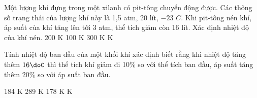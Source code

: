 
\begin{vidu} %
	Một lượng khí đựng trong một xilanh có pit-tông chuyển động được. Các thông số trạng thái của lượng khí này là 1,5 atm, 20 lít, $-23^\circ C$. Khi pit-tông nén khí, áp suất của khí tăng lên tới 3 atm, thể tích giảm còn 16 lít. Xác định nhiệt độ của khí nén.
	\choice
	{200 K}
	{100 K}
	{300 K}
	{ K}
\end{vidu}
\begin{vidu} %
	Tính nhiệt độ ban đầu của một khối khí xác định biết rằng khi nhiệt độ tăng thêm $16\doC$ thì thể tích khí giảm đi 10\% so với thể tích ban đầu, áp suất tăng thêm 20\% so với áp suất ban đầu.
	
	\choice
	{184 K}
	{289 K}
	{178 K}
	{ K}
\end{vidu}
